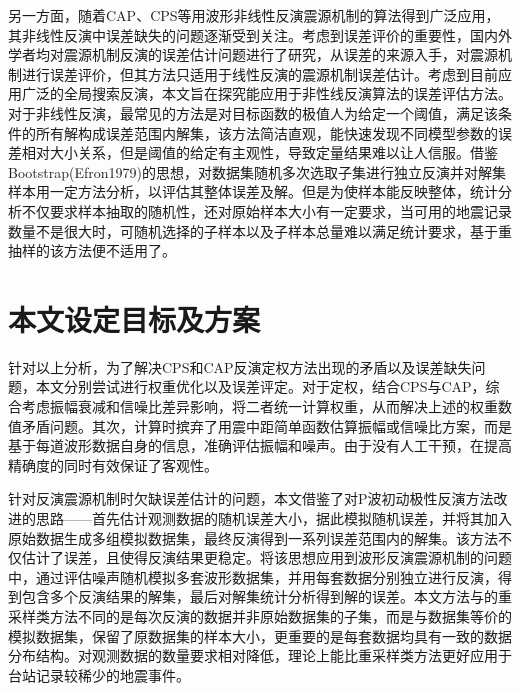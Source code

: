 另一方面，随着CAP、CPS等用波形非线性反演震源机制的算法得到广泛应用\citep{Luo2015,DAmico2014}，其非线性反演中误差缺失的问题逐渐受到关注。考虑到误差评价的重要性，国内外学者均对震源机制反演的误差估计问题进行了研究，\citet{Duputel2012}从误差的来源入手，对震源机制进行误差评价，但其方法只适用于线性反演的震源机制误差估计。考虑到目前应用广泛的全局搜索反演，本文旨在探究能应用于非性线反演算法的误差评估方法。对于非线性反演，最常见的方法是对目标函数的极值人为给定一个阈值，满足该条件的所有解构成误差范围内解集，该方法简洁直观，能快速发现不同模型参数的误差相对大小关系，但是阈值的给定有主观性，导致定量结果难以让人信服。\citet{zhenjianchang2015}借鉴Bootstrap(Efron1979)的思想，对数据集随机多次选取子集进行独立反演并对解集样本用一定方法分析，以评估其整体误差及解。但是为使样本能反映整体，统计分析不仅要求样本抽取的随机性，还对原始样本大小有一定要求，当可用的地震记录数量不是很大时，可随机选择的子样本以及子样本总量难以满足统计要求，基于重抽样的该方法便不适用了。

\section{本文设定目标及方案}

针对以上分析，为了解决CPS和CAP反演定权方法出现的矛盾以及误差缺失问题，本文分别尝试进行权重优化以及误差评定。对于定权，结合CPS与CAP，综合考虑振幅衰减和信噪比差异影响，将二者统一计算权重，从而解决上述的权重数值矛盾问题。其次，计算时摈弃了用震中距简单函数估算振幅或信噪比方案，而是基于每道波形数据自身的信息，准确评估振幅和噪声。由于没有人工干预，在提高精确度的同时有效保证了客观性。

针对反演震源机制时欠缺误差估计的问题，本文借鉴了\citet{Hardebeck2002}对P波初动极性反演方法改进的思路——首先估计观测数据的随机误差大小，据此模拟随机误差，并将其加入原始数据生成多组模拟数据集，最终反演得到一系列误差范围内的解集。该方法不仅估计了误差，且使得反演结果更稳定\citep{Hardebeck2002}。将该思想应用到波形反演震源机制的问题中，通过评估噪声随机模拟多套波形数据集，并用每套数据分别独立进行反演，得到包含多个反演结果的解集，最后对解集统计分析得到解的误差。本文方法与\citet{zhenjianchang2015}的重采样类方法不同的是每次反演的数据并非原始数据集的子集，而是与数据集等价的模拟数据集，保留了原数据集的样本大小，更重要的是每套数据均具有一致的数据分布结构。对观测数据的数量要求相对降低，理论上能比重采样类方法更好应用于台站记录较稀少的地震事件。


